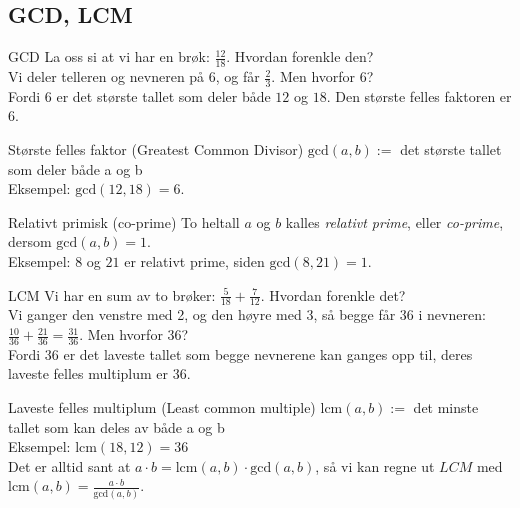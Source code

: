 \subsection*{GCD, LCM}

\begin{frame}{GCD}
    La oss si at vi har en brøk: $\frac{12}{18}$. Hvordan forenkle den?\\
    \pause
    Vi deler telleren og nevneren på 6, og får $\frac{2}{3}$. Men hvorfor 6?\\
    \pause
    Fordi 6 er det største tallet som deler både $12$ og $18$. Den største felles faktoren er 6.

    \begin{block}{Største felles faktor (Greatest Common Divisor)}
        $\text{gcd}(a,b) := $ det største tallet som deler både a og b\\
        Eksempel: $\text{gcd}(12, 18) = 6$.
    \end{block}

    \pause
    \begin{block}{Relativt primisk (co-prime)}
        To heltall $a$ og $b$ kalles \emph{relativt prime}, eller \emph{co-prime}, dersom $\text{gcd}(a,b)=1$.\\
        Eksempel: $8$ og $21$ er relativt prime, siden $\text{gcd}(8,21) = 1$.
    \end{block}
\end{frame}

\begin{frame}{LCM}
    Vi har en sum av to brøker: $\frac{5}{18} + \frac{7}{12}$. Hvordan forenkle det?\\
    \pause
    Vi ganger den venstre med 2, og den høyre med 3, så begge får 36 i nevneren:\\
     $\frac{10}{36} + \frac{21}{36} = \frac{31}{36}$. Men hvorfor 36?\\
    \pause
    Fordi 36 er det laveste tallet som begge nevnerene kan ganges opp til, deres laveste felles multiplum er 36.
    \begin{block}{Laveste felles multiplum (Least common multiple)}
        $\text{lcm}(a,b) :=$ det minste tallet som kan deles av både a og b\\
        Eksempel: $\text{lcm}(18,12)=36$\\
        Det er alltid sant at $a \cdot b = \text{lcm}(a,b) \cdot \text{gcd}(a,b)$, så vi kan regne ut $LCM$ med $\text{lcm}(a,b) = \frac{a \cdot b}{\text{gcd}(a,b)}$.
    \end{block}
\end{frame}

